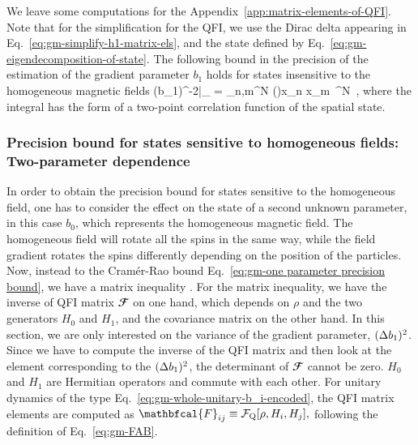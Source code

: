 We leave some computations for the Appendix~\ref{app:matrix-elements-of-QFI}.
Note that for the simplification for the QFI, we use the Dirac delta appearing in Eq.~\eqref{eq:gm-simplify-h1-matrix-els}, and the state defined by Eq.~\eqref{eq:gm-eigendecomposition-of-state}.
The following bound in the precision of the estimation of the gradient parameter $b_1$ holds for states insensitive to the homogeneous magnetic fields
\be
  \label{eq:gm-bound-for-insensitive-and-thermal-state}
  (\Delta b_1)^{-2}|_{\max} = \sum_{n,m}^N \int \prob()x_n x_m \,^N\,
  ,
\ee
where the integral has the form of a two-point correlation function of the spatial state.

\subsubsection{Precision bound for states sensitive to homogeneous fields:
Two-parameter dependence}

In order to obtain the precision bound for states sensitive to the
homogeneous field, one has to consider the effect on the state of a second
unknown parameter, in this case $b_0$, which represents the homogeneous magnetic field.
The homogeneous field will rotate all the spins in the same way,
while the field gradient rotates the spins
differently depending on the position of the particles.
Now, instead to the Cram\'er-Rao bound Eq.~\eqref{eq:gm-one parameter precision bound},
we have a matrix inequality \cite{Paris2009}.
For the matrix inequality, we have the inverse of QFI matrix $\mathbfcal{F}$ on one hand, which depends on $\rho$ and the two generators $H_0$ and $H_1$, and the covariance matrix on the other hand.
In this section, we are only interested on the variance of the gradient parameter, $(\Delta b_1 )^2$.
Since we have to compute the inverse of the QFI matrix and then look at the element corresponding to the $(\Delta b_1 )^2$, the determinant of $\mathbfcal{F}$ cannot be zero.
$H_0$ and $H_1$ are Hermitian operators and commute with each other.
For unitary dynamics of the type Eq.~\eqref{eq:gm-whole-unitary-b_i-encoded}, the QFI matrix elements are computed as $\mathbfcal{F}_{ij}\equiv \qfif{\rho, H_i, H_j},$ following the definition of Eq.~\eqref{eq:gm-FAB}.

